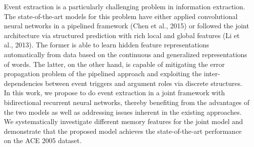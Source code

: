 Event extraction is a particularly challenging problem in information extraction. The state-of-the-art models for this problem have either applied convolutional neural networks in a pipelined framework (Chen et al., 2015) or followed the joint architecture via structured prediction with rich local and global features (Li et al., 2013). The former is able to learn hidden feature representations automatically from data based on the continuous and generalized representations of words. The latter, on the other hand, is capable of mitigating the error propagation problem of the pipelined approach and exploiting the inter-dependencies between event triggers and argument roles via discrete structures. In this work, we propose to do event extraction in a joint framework with bidirectional recurrent neural networks, thereby benefiting from the advantages of the two models as well as addressing issues inherent in the existing approaches. We systematically investigate different memory features for the joint model and demonstrate that the proposed model achieves the state-of-the-art performance on the ACE 2005 dataset.
